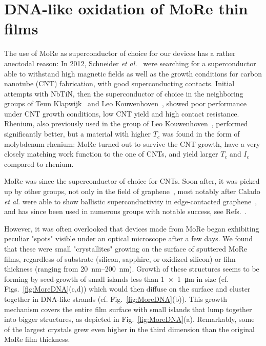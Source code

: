 \section{DNA-like oxidation of MoRe thin films}
\label{sec:more}

The use of MoRe as superconductor of choice for our devices has a rather anectodal reason:
%
In 2012, Schneider \textit{et al.}~\cite{schneiderCouplingCarbonNanotube2012,schneiderSuspendedCarbonNanotubes2014b} were searching for a superconductor able to withstand high magnetic fields as well as the growth conditions for carbon nanotube (CNT) fabrication, with good superconducting contacts.
%
Initial attempts with NbTiN, then the superconductor of choice in the neighboring groups of Teun Klapwijk~\cite{iosadSourceOptimizationMagnetron1999} and Leo Kouwenhoven~\cite{mourikSignaturesMajoranaFermions2012}, showed poor performance under CNT growth conditions, low CNT yield and high contact resistance.
%
Rhenium, also previously used in the group of Leo Kouwenhoven~\cite{keijzersJosephsonEffectsCarbon2012}, performed significantly better, but a material with higher $T_c$ was found in the form of molybdenum rhenium:
%
MoRe turned out to survive the CNT growth, have a very closely matching work function to the one of CNTs, and yield larger $T_c$ and $I_c$ compared to rhenium.

MoRe was since the superconductor of choice for CNTs.
%
Soon after, it was picked up by other groups, not only in the field of graphene~\cite{azizMolybdenumrheniumSuperconductingSuspended2014a}, most notably after Calado \textit{et al.} were able to show ballistic superconductivity in edge-contacted graphene~\cite{caladoBallisticJosephsonJunctions2015d}, and has since been used in numerous groups with notable success, see Refs.~\cite{singhMolybdenumrheniumAlloyBased2014,gotzCosputteredMoReThin2016,blienCarbonNanotubeGrowth2016a,draelosSupercurrentFlowMultiterminal2019,ametSupercurrentQuantumHall2016b,islandThicknessDependentInterlayer2016a,krollMagneticFieldCompatible2018}.


However, it was often overlooked that devices made from MoRe began exhibiting peculiar "spots" visible under an optical microscope after a few days.
% 
We found that these were small "crystallites" growing on the surface of sputtered MoRe films, regardless of substrate (silicon, sapphire, or oxidized silicon) or film thickness (ranging from \SIrange{20}{200}{\nano\meter}).
%
Growth of these structures seems to be forming by seed-growth of small islands less than \SI{1x1}{\micro\meter} in size (cf. Figs.~\ref{fig:MoreDNA}(c,d)) which would then diffuse on the surface and cluster together in DNA-like strands (cf. Fig.~\ref{fig:MoreDNA}(b)).
%
This growth mechanism covers the entire film surface with small islands that lump together into bigger structures, as depicted in Fig.~\ref{fig:MoreDNA}(a).
%
Remarkably, some of the largest crystals grew even higher in the third dimension than the original MoRe film thickness.

